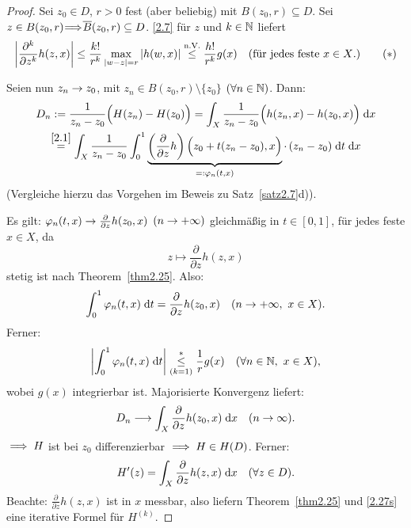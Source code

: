 \documentclass[a4paper,twoside,DIV15,BCOR12mm]{scrbook}
\begin{document}
\begin{proof} Sei $z_0\in D$, $r>0$ fest (aber beliebig) mit $B(z_0,r)\subseteq D$. Sei $z\in B(z_0,r)\!\!\!\implies\!\!\!\overline{B}(z_0,r)\subseteq D$. \eqref{2.7} für $z$ und $k\in\mathbb{N}$ liefert
\[\label{2.27s}\left\lvert\frac{\partial^k}{\partial z^k}h(z,x)\right\lvert\leq \frac{k!}{r^k}\max_{\left\lvert w-z\right\lvert=r}\left\lvert h(w,x)\right\lvert\overset{\text{n.V.}}{\leq}\frac{h!}{r^k}g(x)\quad\text{(für jedes feste $x\in X$.)}\tag{$*$}\]

Seien nun $z_n\rightarrow z_0$, mit $z_n\in B(z_0,r)\setminus\{z_0\}$ $(\forall n\in\mathbb{N})$. Dann:
\begin{gather*}
D_n:= \frac{1}{z_n-z_0}\Bigl(H(z_n)-H(z_0)\Bigr) = \int_{X}^{}{\frac{1}{z_n-z_0}\Bigl(h(z_n,x)-h(z_0,x)\Bigr)}\;\mathrm{d} x\\
\overset{\eqref{2.1}}{=}\int_{X}^{}{\frac{1}{z_n-z_0}\int_{0}^{1}{\underbrace{\left(\frac{\partial}{\partial z}h\right)\Bigl(z_0+t(z_n-z_0),x\Bigr)}_{=:\varphi_n(t,x)}\cdot\,(z_n-z_0)}\;\mathrm{d} t}\;\mathrm{d} x
\end{gather*}
(Vergleiche hierzu das Vorgehen im Beweis zu Satz~\ref{satz2.7}d)).

{Es gilt:} $\varphi_n(t,x)\rightarrow\frac{\partial}{\partial z}h(z_0,x)$ $(n\rightarrow+\infty)$ gleichmäßig in $t\in[0,1]$, für jedes feste $x\in X$, da
\[z\mapsto\frac{\partial}{\partial z}h(z,x)\]
stetig ist nach Theorem~\ref{thm2.25}. Also:
\[\int_{0}^{1}{\varphi_n(t,x)}\;\mathrm{d} t=\frac{\partial}{\partial z}h(z_0,x)\quad(n\rightarrow+\infty,\ x\in X).\]
Ferner:
\[\abs{\integral{0}{1}{\varphi_n(t,x)}{t}}\overset{*}{\underset{(k=1)}{\leq}}\frac{1}{r}g(x)\quad(\forall\nat{n},\ x\in X),\]
wobei $g(x)$ integrierbar ist.
Majorisierte Konvergenz liefert:
\[D_n\longrightarrow\int_{X}^{}{\frac{\partial}{\partial z}h(z_0,x)}\;\mathrm{d} x\quad(n\rightarrow\infty).\]
$\implies H$ ist bei $z_0$ differenzierbar $\implies H\in H(D)$. Ferner:
\[H^\prime(z) = \int_{X}^{}{\frac{\partial}{\partial z}h(z,x)}\;\mathrm{d} x\quad(\forall z\in D).\]
Beachte: $\frac{\partial}{\partial z}h(z,x)$ ist in $x$ messbar, also liefern Theorem~\ref{thm2.25} und \eqref{2.27s} eine iterative Formel für $H^{(k)}$.
\end{proof}
\end{document}

